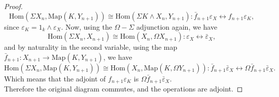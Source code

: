 \documentclass[a4paper,english,11pt]{article}
\theoremstyle{definition}
\theoremstyle{plain}
\theoremstyle{remark}
\newcommand{\Hom}{\text{Hom}}
\newcommand{\Map}{\text{Map}}
\newcommand{\struc}{\varepsilon}
\newcommand{\astruc}{\bar{\varepsilon}}
\begin{document}
\begin{proof}
\[\Hom(\Sigma X_n,\Map(K,Y_{n+1}))\cong\Hom(\Sigma K\wedge X_n,Y_{n+1}): \bar{f}_{n+1}\struc_X\leftrightarrow f_{n+1}\struc_K,\]
since \(\struc_K=1_k\wedge\struc_X\). Now, using the \(\Omega-\Sigma\) adjunction again, we have
\[\Hom(\Sigma X_n,X_{n+1})\cong\Hom(X_n,\Omega X_{n+1}):\struc_X\leftrightarrow\astruc_X,\]
and by naturality in the second variable, using the map \(\bar{f}_{n+1}:X_{n+1}\to \Map(K,Y_{n+1})\), we have 
\[\Hom(\Sigma X_n,\Map(K,Y_{n+1}))\cong\Hom(X_n,\Map(K,\Omega Y_{n+1})): \bar{f}_{n+1}\astruc_X\leftrightarrow\Omega\bar{f}_{n+1}\astruc_X.\]
Which means that the adjoint of \(f_{n+1}\struc_K\) is \(\Omega\bar{f}_{n+1}\astruc_X\). \\
Therefore the original diagram commutes, and the operations are adjoint.

\end{proof}
\end{document}
